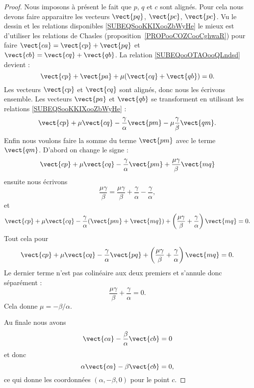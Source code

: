 \begin{proof}
	Nous imposons à présent le fait que \( p\), \( q\) et \( c \) sont alignés. Pour cela nous devons faire apparaitre les vecteurs \( \vect{ pq }\), \( \vect{ pc }\), \( \vect{ pc }\). Vu le dessin et les relations disponibles \eqref{SUBEQSooKKIXooZbWyHe} le mieux est d'utiliser les relations de Chasles  (proposition~\ref{PROPooCOZCooCghwaR}) pour faire \( \vect{ ca }=\vect{ cp }+\vect{ pq }\) et \( \vect{ cb }=\vect{ cq }+\vect{ qb }\).  La relation \eqref{SUBEQooOTAOooQLndsd} devient :
	\begin{equation}
		\vect{ cp }+\vect{ pa }+\mu(\vect{ cq }+\vect{ qb })=0.
	\end{equation}
	Les vecteurs \( \vect{ cp }\) et \( \vect{ cq }\) sont alignés, donc nous les écrivons ensemble. Les vecteurs \( \vect{ pa }\) et \( \vect{ qb }\) se transforment en utilisant les relations \eqref{SUBEQSooKKIXooZbWyHe} :
	\begin{equation}
		\vect{ cp }+\mu\vect{ cq }-\frac{ \gamma }{ \alpha }\vect{ pm }-\mu\frac{ \gamma }{ \beta }\vect{ qm }.
	\end{equation}
	Enfin nous voulons faire la somme du terme \( \vect{ pm }\) avec le terme \( \vect{ qm }\). D'abord on change le signe :
	\begin{equation}
		\vect{ cp }+\mu\vect{ cq }-\frac{ \gamma }{ \alpha }\vect{ pm }+\frac{ \mu\gamma }{ \beta }\vect{ mq }
	\end{equation}
	ensuite nous écrivons
	\begin{equation}
		\frac{ \mu\gamma }{ \beta }=\frac{ \mu\gamma }{ \beta }+\frac{ \gamma }{ \alpha }-\frac{ \gamma }{ \alpha },
	\end{equation}
	et
	\begin{equation}
		\vect{ cp }+\mu\vect{ cq }-\frac{ \gamma }{ \alpha }(\vect{ pm }+\vect{ mq })+\left( \frac{ \mu\gamma }{ \beta }+\frac{ \gamma }{ \alpha } \right)\vect{ mq }=0.
	\end{equation}
	Tout cela pour
	\begin{equation}
		\vect{ cp }+\mu\vect{ cq }-\frac{ \gamma }{ \alpha }\vect{ pq }+\left( \frac{ \mu\gamma }{ \beta }+\frac{ \gamma }{ \alpha } \right)\vect{ mq }=0.
	\end{equation}
	Le dernier terme n'est pas colinéaire aux deux premiers et s'annule donc séparément :
	\begin{equation}
		\frac{ \mu\gamma }{ \beta }+\frac{ \gamma }{ \alpha }=0.
	\end{equation}
	Cela donne \( \mu=-\beta/\alpha\).

	Au finale nous avons
	\begin{equation}
		\vect{ ca }-\frac{ \beta }{ \alpha }\vect{ cb }=0
	\end{equation}
	et donc
	\begin{equation}        \label{EQooWKBWooEWhDiM}
		\alpha\vect{ ca }-\beta\vect{ cb }=0,
	\end{equation}
	ce qui donne les coordonnées \( (\alpha,-\beta,0)\) pour le point \( c\).


\end{proof}
